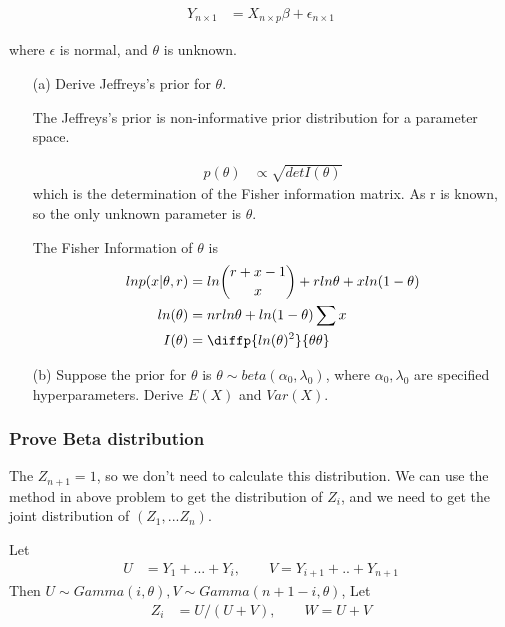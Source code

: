 \documentclass[11pt]{article} %
\begin{document}
\begin{align*}
	Y_{n \times 1} &= X_{n \times p} \beta + \epsilon_{n \times 1}
\end{align*}

where $\epsilon$ is normal, and $\theta$ is unknown.

\begin{itemize}
	\item [(a)] Derive Jeffreys's prior for $\theta$.
	
	The Jeffreys's prior is non-informative prior distribution for a parameter space. 
	
\begin{align*}
	p(\theta) & \propto \sqrt{det I(\theta)}
\end{align*}	
	which is the determination of the Fisher information matrix. As r is known, so the only unknown parameter is $\theta$.
	
	The Fisher Information of $\theta$ is 
\begin{align*}
	ln p(x|\theta, r) &= ln {r+x-1 \choose x} + r ln \theta + x ln (1-\theta) \\
	ln(\theta) &= n r ln \theta + ln (1-\theta) \sum x \\
	I(\theta) &= \diffp{ln(\theta)^2}{\theta \theta}
\end{align*}	
	
	
	\item[(b)] Suppose the prior for $\theta$ is $\theta \sim beta(\alpha_0, \lambda_0)$, where $\alpha_0, \lambda_0$ are specified hyperparameters. Derive $E(X)$ and $Var(X)$.
	
	
\end{itemize}

\subsubsection{Prove Beta distribution}
The $Z_{n+1} = 1$, so we don't need to calculate this distribution. 
We can use the method in above problem to get the distribution of $Z_i$, and we need to get the joint distribution of $(Z_1, ... Z_n)$.

Let 
\begin{align*}
	U &=Y_1 + ...+ Y_i, \qquad V= Y_{i+1}+ .. + Y_{n+1} 
\end{align*}
Then $U \sim Gamma(i, \theta), V \sim Gamma(n+1-i, \theta)$, Let
\begin{align*}
 	Z_i &= U/(U+V), \qquad W = U+V 
\end{align*}
\end{document}
